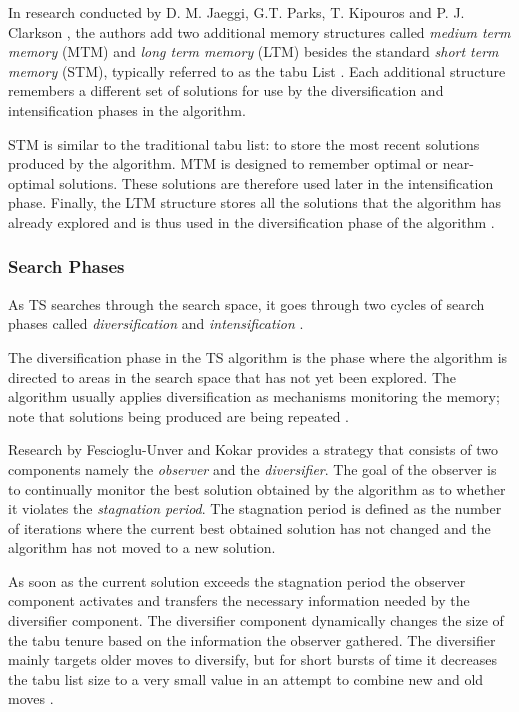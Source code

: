 In research conducted by D. M. Jaeggi, G.T. Parks, T. Kipouros and P. J. Clarkson \cite{MultiObjTabu}, the authors add two additional memory structures called \emph{medium term memory} (MTM) and \emph{long term memory} (LTM) besides the standard \emph{short term memory} (STM), typically referred to as the tabu List \cite{MultiObjTabu}. Each additional structure remembers a different set of solutions for use by the diversification and intensification phases in the algorithm.

STM is similar to the traditional tabu list: to store the most recent solutions produced by the algorithm. MTM is designed to remember optimal or near-optimal solutions. These solutions are therefore used later in the intensification phase. Finally, the LTM structure stores all the solutions that the algorithm has already explored and is thus used in the diversification phase of the algorithm \cite{MultiObjTabu}.

\subsubsection{Search Phases}
\label{TSSearchPhases}
As TS searches through the search space, it goes through two cycles of search phases called \emph{diversification} and \emph{intensification} \cite{TabuParameterization,TabuCrewSchedulingProblem,NonlinearGlobalTabu,SelfControllingReactiveTabu}.

The diversification phase in the TS algorithm is the phase where the algorithm is directed to areas in the search space that has not yet been explored. The algorithm usually applies diversification as mechanisms monitoring the memory; note that solutions being produced are being repeated \cite{ReactiveTabuVHR,SelfControllingReactiveTabu}. 

Research by Fescioglu-Unver and Kokar \cite{SelfControllingReactiveTabu} provides a strategy that consists of two components namely the \emph{observer} and the \emph{diversifier}. The goal of the observer is to continually monitor the best solution obtained by the algorithm as to whether it violates the \emph{stagnation period}. The stagnation period is defined as the number of iterations where the current best obtained solution has not changed and the algorithm has not moved to a new solution\cite{SelfControllingReactiveTabu}. 

As soon as the current solution exceeds the stagnation period the observer component activates and transfers the necessary information needed by the diversifier component. The diversifier component dynamically changes the size of the tabu tenure based on the information the observer gathered. The diversifier mainly targets older moves to diversify, but for short bursts of time it decreases the tabu list size to a very small value in an attempt to combine new and old moves \cite{SelfControllingReactiveTabu}.

